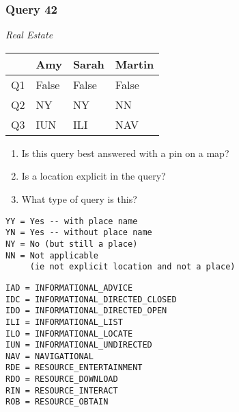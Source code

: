 \begin{frame}[fragile]
\frametitle{Query 42}
\vspace{1em}

\emph{Real Estate}

\vfill

\begin{table}
  \centering
  \begin{tabular}{ l l l l }
    & \textbf{Amy} & \textbf{Sarah} & \textbf{Martin}\\
    \toprule
    Q1 & False & False & False\\
Q2 & NY & NY & NN\\
Q3 & IUN & ILI & NAV\\
    \bottomrule
  \end{tabular}
\end{table}

\vfill

\tiny{

\begin{enumerate}
\item Is this query best answered with a pin on a map?
\item Is a location explicit in the query?
\item What type of query is this?
\end{enumerate}

\vfill

\begin{multicols}{2}
\begin{verbatim}
YY = Yes -- with place name
YN = Yes -- without place name
NY = No (but still a place)
NN = Not applicable 
     (ie not explicit location and not a place)
\end{verbatim}

\columnbreak
\begin{verbatim}
IAD = INFORMATIONAL_ADVICE
IDC = INFORMATIONAL_DIRECTED_CLOSED
IDO = INFORMATIONAL_DIRECTED_OPEN
ILI = INFORMATIONAL_LIST
ILO = INFORMATIONAL_LOCATE
IUN = INFORMATIONAL_UNDIRECTED
NAV = NAVIGATIONAL
RDE = RESOURCE_ENTERTAINMENT
RDO = RESOURCE_DOWNLOAD
RIN = RESOURCE_INTERACT
ROB = RESOURCE_OBTAIN
\end{verbatim}
\end{multicols}
}

\end{frame}


